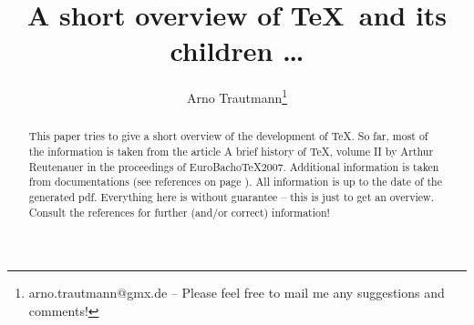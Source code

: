 \documentclass{scrartcl}
\title{A short overview of \TeX\ and its children \dots}
\author{Arno Trautmann\thanks{arno.trautmann@gmx.de -- Please feel free to mail me any suggestions and comments!}}
\date{}
\begin{document}
\maketitle

\begin{abstract}
This paper tries to give a short overview of the development of \TeX. So far, most of the information is taken from the article \textsf{A brief history of \TeX, volume II} by Arthur Reutenauer in the proceedings of \textsf{EuroBacho\TeX 2007}. Additional information is taken from documentations (see references on page \pageref{sec:refs}). All information is up to the date of the generated pdf. Everything here is without guarantee -- this is just to get an overview. Consult the references for further (and/or correct) information!
\end{abstract}

\tableofcontents

\newpage
\end{document}
